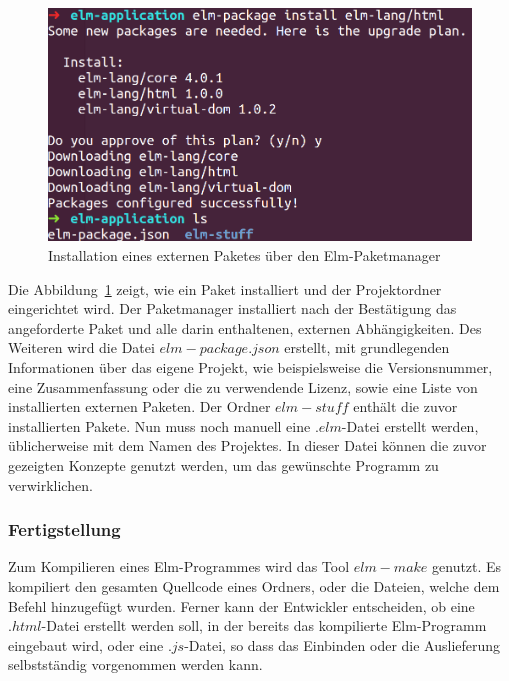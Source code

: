 \begin{figure}[h]
\centering
\includegraphics[scale=0.3]{img/elm-setup.png}
\caption{Installation eines externen Paketes über den Elm-Paketmanager}\label{fig:elm-install-package}
\end{figure}
Die Abbildung~\ref{fig:elm-install-package} zeigt, wie ein Paket installiert und der Projektordner eingerichtet wird. Der Paketmanager installiert nach der Bestätigung das angeforderte Paket und alle darin enthaltenen, externen Abhängigkeiten. Des Weiteren wird die Datei $elm-package.json$ erstellt, mit grundlegenden Informationen über das eigene Projekt, wie beispielsweise die Versionsnummer, eine Zusammenfassung oder die zu verwendende Lizenz, sowie eine Liste von installierten externen Paketen. Der Ordner $elm-stuff$ enthält die zuvor installierten Pakete. Nun muss noch manuell eine $.elm$-Datei erstellt werden, üblicherweise mit dem Namen des Projektes. In dieser Datei können die zuvor gezeigten Konzepte genutzt werden, um das gewünschte Programm zu verwirklichen.


\subsubsection{Fertigstellung}
\label{sec:elm-compile}
Zum Kompilieren eines Elm-Programmes wird das Tool $elm-make$ genutzt. Es kompiliert den gesamten Quellcode eines Ordners, oder die Dateien, welche dem Befehl hinzugefügt wurden. Ferner kann der Entwickler entscheiden, ob eine $.html$-Datei erstellt werden soll, in der bereits das kompilierte Elm-Programm eingebaut wird, oder eine $.js$-Datei, so dass das Einbinden oder die Auslieferung selbstständig vorgenommen werden kann.

